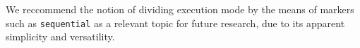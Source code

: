 We reccommend the notion of dividing execution mode by the means of markers
such as \lstinline{sequential} as a relevant topic for future research, due to
its apparent simplicity and versatility.


